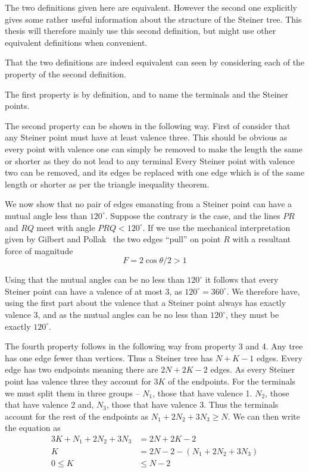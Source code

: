 The two definitions given here are equivalent.  However the second one explicitly
gives some rather useful information about the structure of the Steiner
tree.  This thesis will therefore mainly use this second definition, but might
use other equivalent definitions when convenient.

That the two definitions are indeed equivalent can seen by considering each of
the property of the second definition.

The first property is by definition, and to name the terminals and the
Steiner points.

The second property can be shown in the following way.  First of consider that
any Steiner point must have at least valence three.  This should be obvious as
every point with valence one can simply be removed to make the length the same
or shorter as they do not lead to any terminal Every Steiner point with
valence two can be removed, and its edges be replaced with one edge which is of
the same length or shorter as per the triangle inequality theorem.

We now show that no pair of edges emanating from a Steiner point can have a
mutual angle less than $120^{\circ}$.  Suppose the contrary is the case, and the
lines $PR$ and $RQ$ meet with angle $PRQ < 120^{\circ}$.  If we use the
mechanical interpretation given by Gilbert and Pollak~\cite{Gilbert1968} the two
edges ``pull'' on point $R$ with a resultant force of magnitude
%
\begin{equation}
F = 2 \cos \theta / 2 > 1
\end{equation}
%

Using that the mutual angles can be no less than $120^{\circ}$ it follows that
every Steiner point can have a valence of at most 3, as $120^{\circ} =
360^{\circ}$.  We therefore have, using the first part about the valence that a
Steiner point always has exactly valence 3, and as the mutual angles can be no
less than $120^{\circ}$, they must be exactly $120^{\circ}$.


The fourth property follows in the following way from property 3 and 4.  Any tree
has one edge fewer than vertices.  Thus a Steiner tree has $N+K-1$ edges.  Every
edge has two endpoints meaning there are $2N+2K-2$ edges.  As every Steiner point
has valence three they account for $3K$ of the endpoints.  For the terminals
we must split them in three groups -- $N_1$, those that have valence 1.  $N_2$,
those that have valence 2 and, $N_3$, those that have valence 3.  Thus the
terminals account for the rest of the endpoints as
$N_1 + 2 N_2 + 3 N_3 \ge N$.  We can then write the equation as
%
\begin{align}
  3K + N_1 + 2N_2 + 3N_3 &= 2N + 2K - 2 \\
  K &= 2N - 2 - (N_1 + 2N_2 + 3N_3) \\
  0 \le K &\le N - 2
\end{align}

